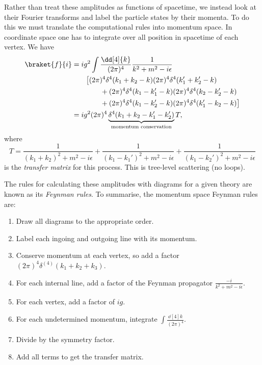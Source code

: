 \documentclass{jknotes} %
\begin{document}
Rather than treat these amplitudes as functions of spacetime, we instead look at their Fourier transforms and label the particle states by their momenta. To do this we must translate the computational rules into momentum space. In coordinate space one has to integrate over all position in spacetime of each vertex. We have
\begin{align}
    \braket{f}{i} &= ig^2\int\frac{\dd[4]{k}}{(2\pi)^4}\frac{1}{k^2+m^2-i\epsilon} \\
                  &\qquad \big[ (2\pi)^4\delta^4(k_1+k_2-k)(2\pi)^4\delta^4(k_1'+k_2'-k) \\
                  &\qquad\qquad + (2\pi)^4\delta^4(k_1-k_1'-k)(2\pi)^4\delta^4(k_2-k_2'-k) \\
                  &\qquad\qquad + (2\pi)^4\delta^4(k_1-k_2'-k)(2\pi)^4\delta^4(k_1'-k_2-k) \big] \\
                  &= ig^2(2\pi)^4\underbrace{\delta^4(k_1+k_2-k_1'-k_2')}_{\text{momentum conservation}} T,
\end{align}
where
\begin{equation}
    T = \frac{1}{(k_1+k_2)^2+m^2-i\epsilon} + \frac{1}{(k_1-k_1')^2+m^2-i\epsilon} + \frac{1}{(k_1-k_2')^2+m^2-i\epsilon}
\end{equation}
is the \emph{transfer matrix} for this process. This is tree-level scattering (no loops).

The rules for calculating these amplitudes with diagrams for a given theory are known as its \emph{Feynman rules}. To summarise, the momentum space Feynman rules are:
\begin{enumerate}
    \item Draw all diagrams to the appropriate order.
    \item Label each ingoing and outgoing line with its momentum.
    \item Conserve momentum at each vertex, so add a factor \((2\pi)^4\delta^{(4)}(k_1+k_2+k_3)\).
    \item For each internal line, add a factor of the Feynman propagator \(\frac{-i}{k^2+m^2-i\epsilon}\).
    \item For each vertex, add a factor of \(ig\).
    \item For each undetermined momentum, integrate \(\int\frac{\dd[4]{k}}{(2\pi)^4}\).
    \item Divide by the symmetry factor.
    \item Add all terms to get the transfer matrix.
\end{enumerate}
\end{document}
